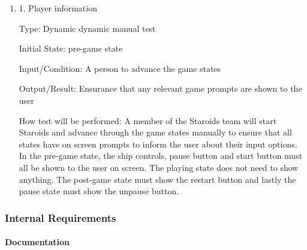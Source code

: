 \documentclass[12pt, titlepage]{article}
\begin{document}
\begin{enumerate}

\item{1. Player information\\}

Type: Dynamic dynamic manual test

Initial State: pre-game state

Input/Condition: A person to advance the game states

Output/Result: Ensurance that any relevant game prompts are shown to the user

How test will be performed: A member of the Staroids team will start Staroids and advance through the game states manually to ensure that all states have on screen prompts to inform the user about their input options. In the pre-game state, the ship controls, pause button and start button must all be shown to the user on screen. The playing state does not need to show anything. The post-game state must show the restart button and lastly the pause state must show the unpause button.

\end{enumerate}

\subsubsection{Internal Requirements}

\paragraph{Documentation}
\end{document}
